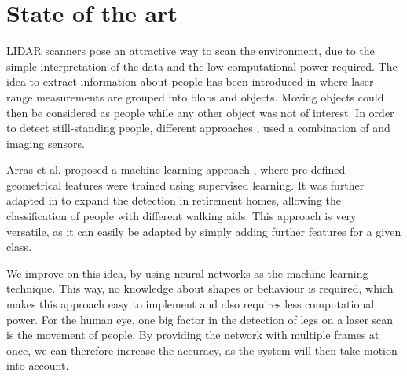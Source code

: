 \section{State of the art}

LIDAR scanners pose an attractive way to scan the environment, due to the simple interpretation of the data and the low computational power required. The idea to extract information about people has been introduced in \cite{1013691} where laser range measurements  are grouped into blobs and objects. Moving objects could then be considered as people while any other object was not of interest. In order to detect still-standing people, different approaches \cite{kleinehagenbrock2002person}, \cite{aguirre2014leg} used a combination of  and imaging sensors.

Arras et al. proposed a machine learning approach \cite{Arras07usingboosted}, where pre-defined geometrical features were trained using supervised learning. It was further adapted in \cite{weinrich2014people} to expand the detection in retirement homes, allowing the classification of people with different walking aids. This approach is very versatile, as it can easily be adapted by simply adding further features for a given class.

We improve on this idea, by using neural networks as the machine learning technique. This way, no knowledge about shapes or behaviour is required, which makes this approach easy to implement and also requires less computational power. For the human eye, one big factor in the detection of legs on a laser scan is the movement of people. By providing the network with multiple frames at once, we can therefore increase the accuracy, as the system will then take motion into account.